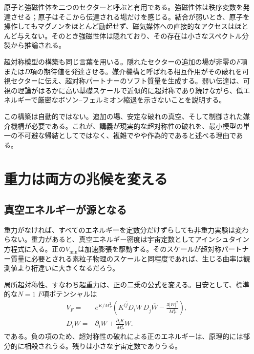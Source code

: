 原子と強磁性体を二つのセクターと呼ぶと有用である。強磁性体は秩序変数を発達させる；原子はそこから伝達される場だけを感じる。結合が弱いとき、原子を操作してもマグノンをほとんど励起せず、磁気媒体への直接的なアクセスはほとんど与えない。そのとき強磁性体は隠れており、その存在は小さなスペクトル分裂から推論される。

超対称模型の構築も同じ言葉を用いる。隠れたセクターの追加の場が非零の\(F\)項または\(D\)項の期待値を発達させる。媒介機構と呼ばれる相互作用がその破れを可視セクターに伝え、超対称パートナーのソフト質量を生成する。弱い伝達は、可視の理論がはるかに高い基礎スケールで近似的に超対称であり続けながら、低エネルギーで厳密なボソン--フェルミオン縮退を示さないことを説明する。

この構築は自動的ではない。追加の場、安定な破れの真空、そして制御された媒介機構が必要である。これが、講義が現実的な超対称性の破れを、最小模型の単一の不可避な帰結としてではなく、複雑でやや作為的であると述べる理由である。

\section{重力は両方の兆候を変える}

\subsection{真空エネルギーが源となる}

重力がなければ、すべてのエネルギーを定数分だけずらしても非重力実験は変わらない。重力があると、真空エネルギー密度は宇宙定数としてアインシュタイン方程式に入る。正の\(V_{\min}\)は加速膨張を駆動する。そのスケールが超対称パートナー質量に必要とされる素粒子物理のスケールと同程度であれば、生じる曲率は観測値より桁違いに大きくなるだろう。

\begin{classroomqa}
\end{classroomqa}

局所超対称性、すなわち超重力は、正の二乗の公式を変える。目安として、標準的な\(N=1\) \(F\)項ポテンシャルは
\begin{equation}
\begin{aligned}
V_F={}&e^{K/M_P^2}
\left(
K^{i\bar j}D_iW\,D_{\bar j}\overline W
-\frac{3|W|^2}{M_P^2}
\right),\\
D_iW={}&\partial_iW+\frac{\partial_iK}{M_P^2}W.
\end{aligned}
\label{eq:l9-sugra-potential}
\end{equation}
である。負の項のため、超対称性の破れによる正のエネルギーは、原理的には部分的に相殺されうる。残りは小さな宇宙定数でありうる。

